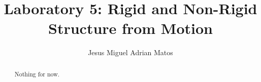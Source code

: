 \documentclass[]{article}
\title{Laboratory 5: Rigid and Non-Rigid Structure from Motion}
\author{Jesus Miguel Adrian Matos}
\begin{document}
\maketitle

\begin{abstract}
	Nothing for now.
\end{abstract}
 




\end{document}
